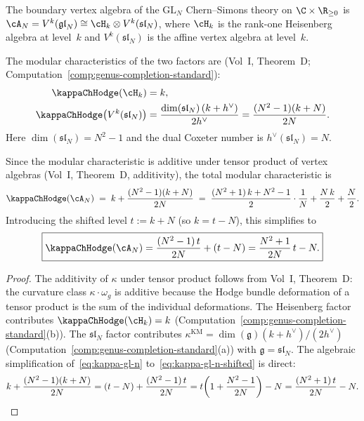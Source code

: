 \begin{computation}
\label{comp:kappa-gl-n}
The boundary vertex algebra of the $\mathrm{GL}_N$ Chern--Simons theory
on $\C \times \R_{\ge 0}$ is
$\cA_N = V^k(\mathfrak{gl}_N) \cong \cH_k \otimes V^k(\mathfrak{sl}_N)$,
where $\cH_k$ is the rank-one Heisenberg algebra at level~$k$ and
$V^k(\mathfrak{sl}_N)$ is the affine vertex algebra at level~$k$.

The modular characteristics of the two factors are
(Vol~I, Theorem~D; Computation~\ref{comp:genus-completion-standard}):
\begin{align}
\label{eq:kappa-heisenberg-factor}
\kappaChHodge(\cH_k) &= k, \\
\label{eq:kappa-sln-factor}
\kappaChHodge\bigl(V^k(\mathfrak{sl}_N)\bigr)
&= \frac{\dim(\mathfrak{sl}_N)\,(k + h^\vee)}{2h^\vee}
= \frac{(N^2-1)(k+N)}{2N}.
\end{align}
Here $\dim(\mathfrak{sl}_N) = N^2 - 1$ and the dual Coxeter number is
$h^\vee(\mathfrak{sl}_N) = N$.

Since the modular characteristic is additive under tensor product of
vertex algebras (Vol~I, Theorem~D, additivity), the total modular
characteristic is
\begin{equation}\label{eq:kappa-gl-n}
\kappaChHodge(\cA_N) \;=\; k + \frac{(N^2-1)(k+N)}{2N}
\;=\; \frac{(N^2+1)\,k + N^2 - 1}{2}
\cdot \frac{1}{N} + \frac{N\,k}{2} + \frac{N}{2}.
\end{equation}
Introducing the shifted level $t := k + N$ (so $k = t - N$), this simplifies to
\begin{equation}\label{eq:kappa-gl-n-shifted}
\boxed{
\kappaChHodge(\cA_N)
= \frac{(N^2 - 1)\,t}{2N} + (t - N)
= \frac{N^2 + 1}{2N}\,t - N.
}
\end{equation}
\end{computation}

\begin{proof}
The additivity of $\kappa$ under tensor product follows from Vol~I,
Theorem~D: the curvature class $\kappa \cdot \omega_g$ is additive
because the Hodge bundle deformation of a tensor product is the sum
of the individual deformations. The Heisenberg factor contributes
$\kappaChHodge(\cH_k) = k$ (Computation~\ref{comp:genus-completion-standard}(b)).
The $\mathfrak{sl}_N$ factor contributes
$\kappa^{\mathrm{KM}} = \dim(\mathfrak{g})(k+h^\vee)/(2h^\vee)$
(Computation~\ref{comp:genus-completion-standard}(a)) with
$\mathfrak{g} = \mathfrak{sl}_N$. The algebraic simplification
of~\eqref{eq:kappa-gl-n} to~\eqref{eq:kappa-gl-n-shifted} is direct:
\[
k + \frac{(N^2-1)(k+N)}{2N}
= (t-N) + \frac{(N^2-1)\,t}{2N}
= t\!\left(1 + \frac{N^2-1}{2N}\right) - N
= \frac{(N^2+1)\,t}{2N} - N. \qedhere
\]
\end{proof}


